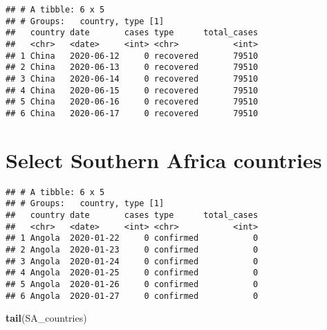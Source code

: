 \documentclass[
]{article}
\newenvironment{Shaded}{\begin{snugshade}}{\end{snugshade}}
\newcommand{\KeywordTok}[1]{\textcolor[rgb]{0.13,0.29,0.53}{\textbf{#1}}}
\newcommand{\NormalTok}[1]{#1}
\newcommand{\OperatorTok}[1]{\textcolor[rgb]{0.81,0.36,0.00}{\textbf{#1}}}
\newcommand{\StringTok}[1]{\textcolor[rgb]{0.31,0.60,0.02}{#1}}
\begin{document}
\begin{verbatim}
## # A tibble: 6 x 5
## # Groups:   country, type [1]
##   country date       cases type      total_cases
##   <chr>   <date>     <int> <chr>           <int>
## 1 China   2020-06-12     0 recovered       79510
## 2 China   2020-06-13     0 recovered       79510
## 3 China   2020-06-14     0 recovered       79510
## 4 China   2020-06-15     0 recovered       79510
## 5 China   2020-06-16     0 recovered       79510
## 6 China   2020-06-17     0 recovered       79510
\end{verbatim}

\hypertarget{select-southern-africa-countries}{%
\section{Select Southern Africa
countries}\label{select-southern-africa-countries}}

\begin{Shaded}
\end{Shaded}

\begin{verbatim}
## # A tibble: 6 x 5
## # Groups:   country, type [1]
##   country date       cases type      total_cases
##   <chr>   <date>     <int> <chr>           <int>
## 1 Angola  2020-01-22     0 confirmed           0
## 2 Angola  2020-01-23     0 confirmed           0
## 3 Angola  2020-01-24     0 confirmed           0
## 4 Angola  2020-01-25     0 confirmed           0
## 5 Angola  2020-01-26     0 confirmed           0
## 6 Angola  2020-01-27     0 confirmed           0
\end{verbatim}

\begin{Shaded}
\begin{Highlighting}[]
\KeywordTok{tail}\NormalTok{(SA_countries)}
\end{Highlighting}
\end{Shaded}
\end{document}
